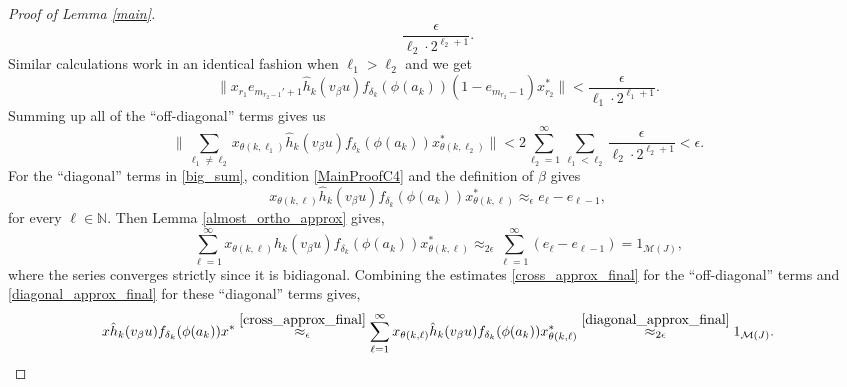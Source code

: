 \documentclass[reqno]{amsart}
\theoremstyle{definition}
\theoremstyle{remark}
\numberwithin{equation}{section}
\theoremstyle{definition}
\newcommand{\calM}{\mathcal{M}}
\begin{document}
\begin{proof}[Proof of Lemma \ref{main}]
\begin{equation}
\frac{\epsilon}{\ell_{2}\cdot 2^{\ell_{2}+1}}.  
\end{equation} 
Similar calculations work in an identical fashion when $\ell_{1} > \ell_{2}$ and we get 
\begin{equation} 
\big\|x_{r_{1}}e_{m_{r_{2}-1}'+1}\hat{h}_k(v_\beta u)f_{\delta_k}(\phi(a_k))(1-e_{m_{r_{2}}-1})x_{r_{2}}^* \big\| < 
\frac{\epsilon}{\ell_{1}\cdot 2^{\ell_{1}+1}}. 
\end{equation} 
Summing up all of the ``off-diagonal'' terms gives us 
\begin{equation}\label{cross_approx_final} 
\bigg\|\sum_{\ell_1\neq \ell_2}x_{\theta(k, \ell_{1})}\hat{h}_{k}(v_\beta u)f_{\delta_{k}}(\phi(a_{k}))x_{\theta(k, \ell_{2})}^*\bigg\| < 2\sum_{\ell_2=1}^{\infty}\sum_{\ell_1<\ell_2}\frac{\epsilon}{\ell_2\cdot 2^{\ell_2+1}}<\epsilon. 
\end{equation}
For the ``diagonal'' terms in \eqref{big_sum}, condition \eqref{MainProofC4} and the definition of $\beta$ gives
\begin{equation} 
x_{\theta(k, \ell)} \hat{h}_{k} (v_{\beta} u) f_{\delta_{k}}(\phi(a_{k}))  x_{\theta(k, \ell)} ^{\ast}\approx_{\epsilon} e_{\ell}-e_{\ell-1}, 
\end{equation}  
for every $\ell\in \mathbb{N}$. Then Lemma \ref{almost_ortho_approx} gives, 
\begin{equation} 
\label{diagonal_approx_final} 
\sum_{\ell=1}^{\infty} x_{\theta(k, \ell)} \hat{h}_{k} (v_{\beta} u) f_{\delta_{k}}(\phi(a_{k}))  x_{\theta(k, \ell)} ^{\ast}\approx_{2\epsilon} \sum_{\ell=1}^{\infty} (e_{\ell}-e_{\ell-1}) = 1_{\calM(J)}, 
\end{equation} 
where the series converges strictly since it is bidiagonal. Combining the estimates \eqref{cross_approx_final} for the ``off-diagonal'' terms and \eqref{diagonal_approx_final} for these ``diagonal'' terms gives, 
\begin{equation}  
\label{multi_est_final} 
x \hat{h}_{k} (v_{\beta} u)f_{\delta_{k}}(\phi(a_k)) x^{\ast} \stackrel{\eqref{cross_approx_final}}{\approx_{\epsilon}} \sum_{\ell=1}^{\infty} x_{\theta(k, \ell)} \hat{h}_{k} (v_{\beta} u) f_{\delta_{k}}(\phi(a_{k}))  x_{\theta(k, \ell)} ^{\ast} \stackrel{\eqref{diagonal_approx_final}}{\approx_{2\epsilon}} 1_{\calM(J)}.
\end{equation}   


\end{proof}
\end{document}
